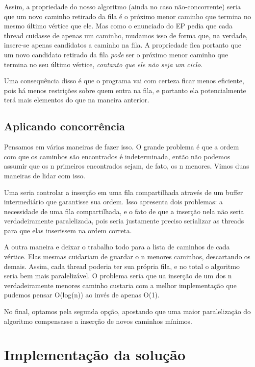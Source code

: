 \documentclass[a4paper,11pt]{article}
\begin{document}
    Assim, a propriedade do nosso algoritmo (ainda no caso não-concorrente)
    seria que um novo caminho retirado da fila é o próximo menor caminho que
    termina no mesmo último vértice que ele. Mas como o enunciado do EP pedia
    que cada thread cuidasse de apenas um caminho, mudamos isso de forma que, na
    verdade, insere-se apenas candidatos a caminho na fila. A propriedade fica
    portanto que um novo candidato retirado da fila \textit{pode} ser o próximo
    menor caminho que termina no seu último vértice, \textit{contanto que ele
    não seja um ciclo}.

    Uma consequência disso é que o programa vai com certeza ficar menos
    eficiente, pois há menos restrições sobre quem entra na fila, e portanto ela
    potencialmente terá mais elementos do que na maneira anterior.

  \subsection{Aplicando concorrência}
    Pensamos em várias maneiras de fazer isso. O grande problema é que a ordem
    com que os caminhos são encontrados é indeterminada, então não podemos
    assumir que os n primeiros encontrados sejam, de fato, os n menores. Vimos
    duas maneiras de lidar com isso.

    Uma seria controlar a inserção em uma fila compartilhada através de um
    buffer intermediário que garantisse sua ordem. Isso apresenta dois
    problemas: a necessidade de uma fila compartilhada, e o fato de que a
    inserção nela não seria verdadeiramente paralelizada, pois seria justamente
    preciso serializar as threads para que elas inserissem na ordem correta.

    A outra maneira e deixar o trabalho todo para a lista de caminhos de cada
    vértice. Elas mesmas cuidariam de guardar o n menores caminhos, descartando
    os demais. Assim, cada thread poderia ter sua própria fila, e no total o
    algoritmo seria bem mais paralelizável. O problema seria que ua inserção de
    um dos n verdadeiramente menores caminho custaria com a melhor implementação
    que pudemos pensar O(log(n)) ao invés de apenas O(1).

    No final, optamos pela segunda opção, apostando que uma maior paralelização
    do algoritmo compensasse a inserção de novos caminhos mínimos.

\section{Implementação da solução}
\end{document}
